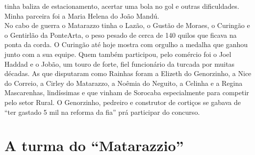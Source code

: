 \documentclass[12pt,brazil,]{book}
\begin{document}
tinha baliza de estacionamento, acertar uma bola no gol e outras
dificuldades. Minha parceira foi a Maria Helena do João Mandú.\\
No cabo de guerra o Matarazzo tinha o Lazão, o Gustão de Moraes, o
Curingão e o Gentirlão da PonteArta, o peso pesado de cerca de 140
quilos que ficava na ponta da corda. O Curingão até hoje mostra com
orgulho a medalha que ganhou junto com a sua equipe. Quem também
participou, pelo comércio foi o Joel Haddad e o Jobão, um touro de
forte, fiel funcionário da turcada por muitas décadas. As que disputaram
como Rainhas foram a Elizeth do Genorzinho, a Nice do Correio, a Cirley
do Matarazzo, a Noêmia do Neguito, a Celinha e a Regina Mascarenhas,
lindíssimas e que vinham de Sorocaba especialmente para competir pelo
setor Rural. O Genorzinho, pedreiro e construtor de cortiços se gabava
de ``ter gastado 5 mil na reforma da fia'' prá participar do concurso.

\section{\texorpdfstring{A turma do
``Matarazzio''}{A turma do Matarazzio}}\label{a-turma-do-matarazzio}
\end{document}
